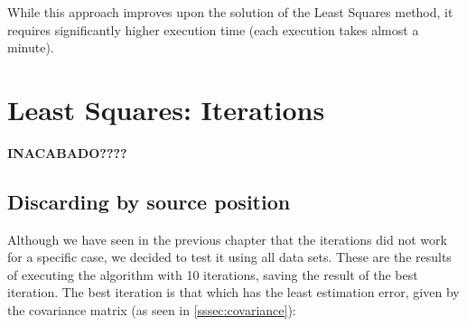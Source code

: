 While this approach improves upon the solution of the Least Squares method, it requires significantly higher execution time (each execution takes almost a minute).

\clearpage

\section{Least Squares: Iterations}

\textbf{INACABADO????}

\subsection{Discarding by source position}

Although we have seen in the previous chapter that the iterations did not work for a specific case, we decided to test it using all data sets. These are the results of executing the algorithm with 10 iterations, saving the result of the best iteration. The best iteration is that which has the least estimation error, given by the covariance matrix (as seen in \ref{sssec:covariance}):

